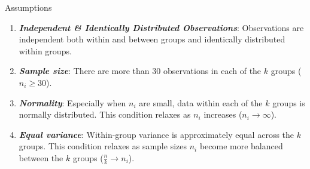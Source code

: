 \documentclass[
  ignorenonframetext,
]{beamer}
\providecommand{\tightlist}{%
  \setlength{\itemsep}{0pt}\setlength{\parskip}{0pt}}\usepackage{longtable,booktabs,array}
\begin{document}
\begin{frame}{Assumptions}
\label{assumptions}
\begin{enumerate}
\tightlist
\item
  \textbf{\emph{Independent \& Identically Distributed Observations}}:
  Observations are independent both within and between groups and
  identically distributed within groups.
\end{enumerate}

\pause

\begin{enumerate}
\setcounter{enumi}{1}
\tightlist
\item
  \textbf{\emph{Sample size}}: There are more than 30 observations in
  each of the \(k\) groups (\(n_i \ge 30\)).
\end{enumerate}

\pause

\begin{enumerate}
\setcounter{enumi}{2}
\tightlist
\item
  \textbf{\emph{Normality}}: Especially when \(n_i\) are small, data
  within each of the \(k\) groups is normally distributed. This
  condition relaxes as \(n_i\) increases (\(n_i \to \infty\)).
\end{enumerate}

\pause

\begin{enumerate}
\setcounter{enumi}{3}
\tightlist
\item
  \textbf{\emph{Equal variance}}: Within-group variance is approximately
  equal across the \(k\) groups. This condition relaxes as sample sizes
  \(n_i\) become more balanced between the \(k\) groups
  (\(\frac{n}{k} \to n_i\)).
\end{enumerate}
\end{frame}
\end{document}
